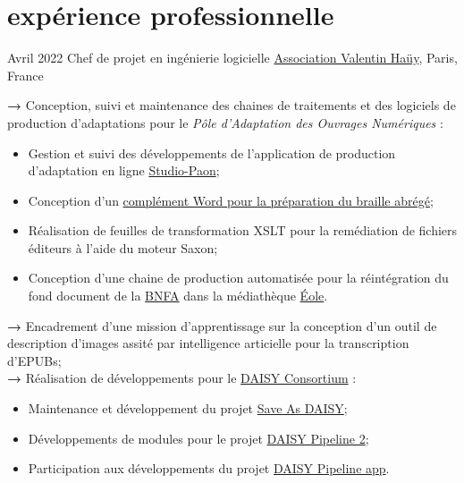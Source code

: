 \documentclass[]{friggeri-cv-a4} %
\begin{document}

\section{expérience professionnelle}
\begin{entrylist}
\entry
{Avril 2022}
{Chef de projet en ingénierie logicielle}
{\href{http://avh.asso.fr/}{Association Valentin Haüy}, Paris, France}
{
\textbf{→ }Conception, suivi et maintenance des chaines de traitements et des logiciels 
de production d'adaptations pour le \emph{Pôle d'Adaptation des Ouvrages Numériques} :
\begin{itemize}
\item Gestion et suivi des développements de l'application de production 
    d'adaptation en ligne \href{https://github.com/studio-PAON-AVH/studio-paon}{Studio-Paon};
\item Conception d'un \href{https://github.com/studio-PAON-AVH/complement-word-braille}{complément 
    Word pour la préparation du braille abrégé};
\item Réalisation de feuilles de transformation XSLT pour la remédiation 
    de fichiers éditeurs à l'aide du moteur Saxon;
\item Conception d'une chaine de production automatisée pour la réintégration 
    du fond document de la \href{https://www.bnfa.fr}{BNFA} dans 
    la médiathèque \href{https://eole.avh.asso.fr}{Éole}.
\end{itemize}
\textbf{→  }Encadrement d'une mission d'apprentissage sur la conception d'un outil 
de description d'images assité par intelligence articielle pour la transcription 
d'EPUBs;\\
\textbf{→  }Réalisation de développements pour le \href{https://daisy.org}{DAISY Consortium} :
\begin{itemize}
\item Maintenance et développement du projet \href{https://github.com/daisy/word-save-as-daisy}{Save As DAISY};
\item Développements de modules pour le projet \href{https://github.com/daisy/pipeline}{DAISY Pipeline 2};
\item Participation aux développements du projet \href{https://github.com/daisy/pipeline-ui}{DAISY Pipeline app}.

\end{itemize}}
\end{entrylist}
\end{document}
